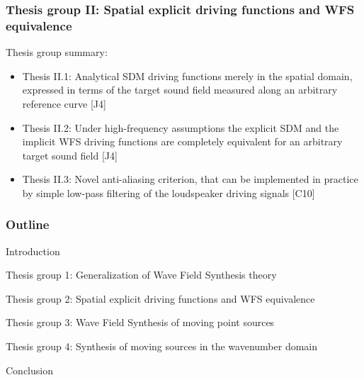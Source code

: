 \documentclass{beamer}
\begin{document}
\begin{frame}
\frametitle{Thesis group II: Spatial explicit driving functions and WFS equivalence}
Thesis group summary:
	\vspace{3mm}
	\begin{itemize}
	\item Thesis II.1: Analytical SDM driving functions merely in the spatial domain, expressed in terms of the target sound field measured along an arbitrary reference curve [J4]	\vspace{3mm}
	\item Thesis II.2: Under high-frequency assumptions the explicit SDM and the implicit WFS driving functions are completely equivalent for an arbitrary target sound field [J4]	\vspace{3mm}
	\item Thesis II.3: Novel anti-aliasing criterion, that can be implemented in practice by simple low-pass filtering of the loudspeaker driving signals [C10]
	\end{itemize}
\end{frame}
	
\begin{frame}
\frametitle{Outline}
\begin{itemize}
	\item Introduction \vspace{3mm}
	\item Thesis group 1: Generalization of Wave Field Synthesis theory \vspace{3mm}
	\item Thesis group 2: Spatial explicit driving functions and WFS equivalence\vspace{3mm}
	\item {\color{blue} Thesis group 3: Wave Field Synthesis of moving point sources \vspace{3mm}
	\item Thesis group 4: Synthesis of moving sources in the wavenumber domain \vspace{3mm}} 
	\item Conclusion
\end{itemize}
\end{frame}
\end{document}

